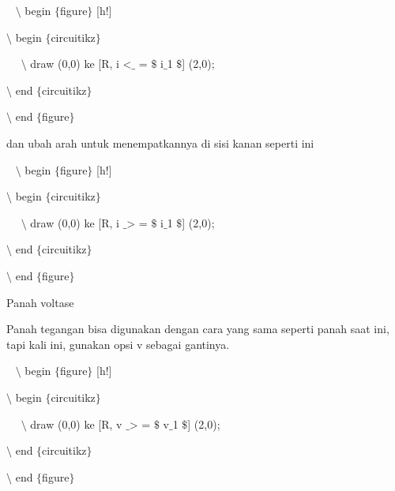 \noindent 
~ $\setminus$ begin $ \{ $figure$ \} $ [h!]
\par


\noindent 
 $\setminus$ begin $ \{ $circuitikz$ \} $
\par


\noindent 
~~ $\setminus$ draw (0,0) ke [R, i <$ \_ $ = $\$$ i$ \_ $1 $\$$] (2,0);
\par


\noindent 
 $\setminus$ end $ \{ $circuitikz$ \} $
\par


\noindent 
 $\setminus$ end $ \{ $figure$ \} $ 
\par


\noindent 
dan ubah arah untuk menempatkannya di sisi kanan seperti ini
\par


\noindent 
~ $\setminus$ begin $ \{ $figure$ \} $ [h!]
\par


\noindent 
 $\setminus$ begin $ \{ $circuitikz$ \} $
\par


\noindent 
~~ $\setminus$ draw (0,0) ke [R, i $ \_ $> = $\$$ i$ \_ $1 $\$$] (2,0);
\par


\noindent 
 $\setminus$ end $ \{ $circuitikz$ \} $
\par


\noindent 
 $\setminus$ end $ \{ $figure$ \} $ 
\par


\noindent 
Panah voltase
\par


\noindent 
Panah tegangan bisa digunakan dengan cara yang sama seperti panah saat ini, tapi kali ini, gunakan opsi v sebagai gantinya.
\par


\noindent 
~ $\setminus$ begin $ \{ $figure$ \} $ [h!]
\par


\noindent 
 $\setminus$ begin $ \{ $circuitikz$ \} $
\par


\noindent 
~~ $\setminus$ draw (0,0) ke [R, v $ \_ $> = $\$$ v$ \_ $1 $\$$] (2,0);
\par


\noindent 
 $\setminus$ end $ \{ $circuitikz$ \} $
\par


\noindent 
 $\setminus$ end $ \{ $figure$ \} $ 
\par


